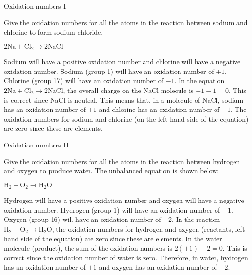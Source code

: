 
\begin{wex}{Oxidation numbers I}{Give the oxidation numbers for all the atoms in the reaction between sodium and chlorine to form sodium chloride.
\begin{center}
$2\text{Na} + \text{Cl}_2 \rightarrow 2\text{NaCl}$
\end{center}
}{
Sodium will have a positive oxidation number and chlorine will have a negative oxidation number.
Sodium (group 1) will have an oxidation number of $+1$. Chlorine (group 17) will have an oxidation number of $-1$. 
In the equation $2\text{Na} + \text{Cl}_2 \rightarrow 2\text{NaCl}$, the overall charge on the NaCl molecule is $+1-1=0$. This is correct since NaCl is neutral. This means that, in a molecule of NaCl, sodium has an oxidation number of $+1$ and chlorine has an oxidation number of $-1$. The oxidation numbers for sodium and chlorine (on the left hand side of the equation) are zero since these are elements.
}
\end{wex}

\begin{wex}{Oxidation numbers II}{Give the oxidation numbers for all the atoms in the reaction between hydrogen and oxygen to produce water. The unbalanced equation is shown below:
\begin{center}
$\text{H}_{2} + \text{O}_{2} \rightarrow \text{H}_{2}\text{O}$
\end{center}
}{
Hydrogen will have a positive oxidation number and oxygen will have a negative oxidation number.
Hydrogen (group 1) will have an oxidation number of $+1$. Oxygen (group 16) will have an oxidation number of $-2$. 
In the reaction $\text{H}_{2} + \text{O}_{2} \rightarrow \text{H}_{2}\text{O}$, the oxidation numbers for hydrogen and oxygen (reactants, left hand side of the equation) are zero since these are elements. In the water molecule (product), the sum of the oxidation numbers is $2(+1)-2=0$. This is correct since the oxidation number of water is zero. Therefore, in water, hydrogen has an oxidation number of $+1$ and oxygen has an oxidation number of $-2$.
}
\end{wex}

